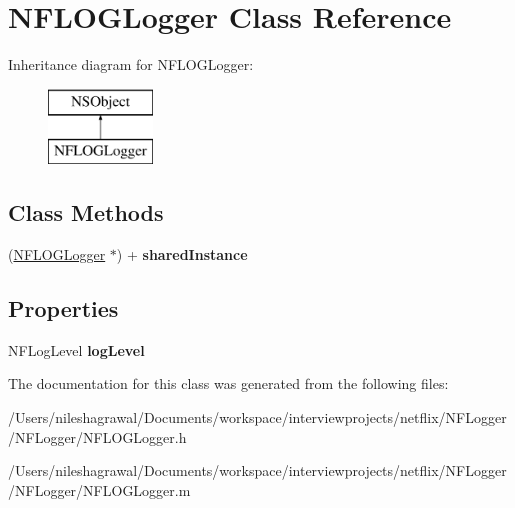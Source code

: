 \hypertarget{interface_n_f_l_o_g_logger}{}\section{N\+F\+L\+O\+G\+Logger Class Reference}
\label{interface_n_f_l_o_g_logger}
Inheritance diagram for N\+F\+L\+O\+G\+Logger\+:\begin{figure}[H]
\begin{center}
\leavevmode
\includegraphics[height=2.000000cm]{interface_n_f_l_o_g_logger}
\end{center}
\end{figure}
\subsection*{Class Methods}
\begin{DoxyCompactItemize}
\item 
\mbox{\label{interface_n_f_l_o_g_logger_a2deb73d7658801bd84efe491e4619273}} 
(\hyperlink{interface_n_f_l_o_g_logger}{N\+F\+L\+O\+G\+Logger} $\ast$) + {\bfseries shared\+Instance}
\end{DoxyCompactItemize}
\subsection*{Properties}
\begin{DoxyCompactItemize}
\item 
\mbox{\label{interface_n_f_l_o_g_logger_a9a50a7828822943d3b693cd839e2cade}} 
N\+F\+Log\+Level {\bfseries log\+Level}
\end{DoxyCompactItemize}


The documentation for this class was generated from the following files\+:\begin{DoxyCompactItemize}
\item 
/\+Users/nileshagrawal/\+Documents/workspace/interviewprojects/netflix/\+N\+F\+Logger/\+N\+F\+Logger/N\+F\+L\+O\+G\+Logger.\+h\item 
/\+Users/nileshagrawal/\+Documents/workspace/interviewprojects/netflix/\+N\+F\+Logger/\+N\+F\+Logger/N\+F\+L\+O\+G\+Logger.\+m\end{DoxyCompactItemize}
